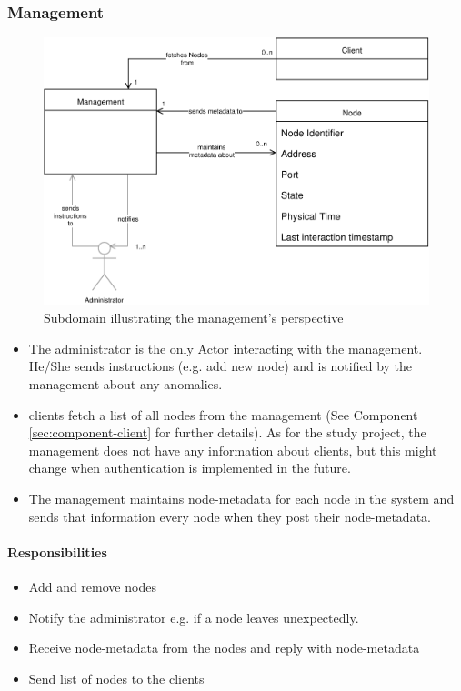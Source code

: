 \subsubsection{Management}\label{sec:component-management}

\begin{figure}[h]
    \centering
    \includegraphics[width=0.75\linewidth]{resources/management_domain_model}
    \caption[Management Subdomain]{Subdomain illustrating the \gls{management}'s perspective}
\end{figure}
\begin{itemize}
    \item The \gls{administrator} is the only Actor interacting with the \gls{management}. He/She sends instructions (e.g. add new \gls{node}) and is notified by the \gls{management} about any anomalies.
    \item \glspl{client} fetch a list of all \glspl{node} from the \gls{management} (See Component \ref{sec:component-client}  for further details). As for the study project, the \gls{management} does not have any information about \glspl{client}, but this might change when authentication is implemented in the future.
    \item The \gls{management} maintains \gls{node-metadata} for each \gls{node} in the \gls{system} and sends that information every \gls{node} when they post their \gls{node-metadata}.
\end{itemize}

\paragraph{Responsibilities}
\begin{itemize}
    \item Add and remove \glspl{node}
    \item Notify the \gls{administrator} e.g. if a \gls{node} leaves unexpectedly.
    \item Receive \gls{node-metadata} from the \glspl{node} and reply with \gls{node-metadata}
    \item Send list of \glspl{node} to the \glspl{client}
\end{itemize}

